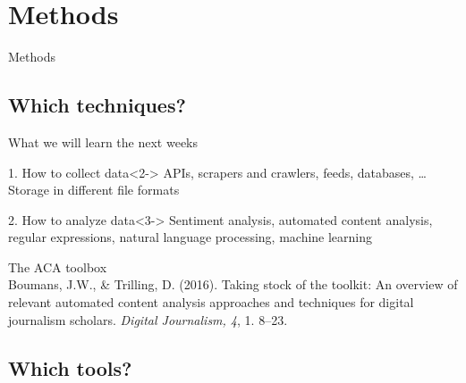 \section{Methods}
\begin{frame}
Methods
\end{frame}

\subsection{Which techniques?}

\begin{frame}{What we will learn the next weeks}
\begin{block}{1. How to collect data}<2->
APIs, scrapers and crawlers, feeds, databases, \ldots \\
Storage in different file formats
\end{block}
\begin{block}{2. How to analyze data}<3->
Sentiment analysis, automated content analysis, regular expressions, natural language processing, machine learning
\end{block}
\end{frame}


\begin{frame}{The ACA toolbox}
	\\
	\tiny
	Boumans, J.W., \& Trilling, D. (2016). Taking stock of the toolkit: An overview of relevant automated content analysis approaches and techniques for digital journalism scholars. \emph{Digital Journalism, 4}, 1. 8--23.
\end{frame}


\subsection{Which tools?}


